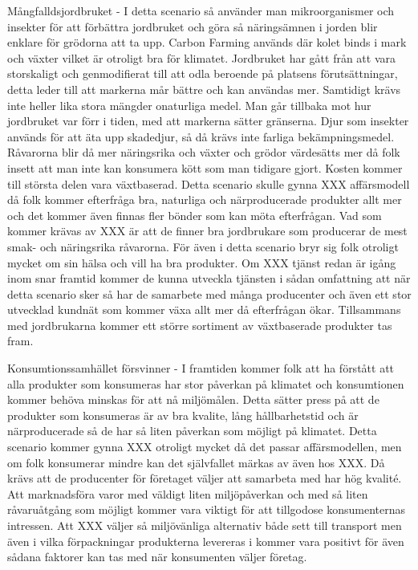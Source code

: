 \documentclass[10pt,a4paper,oneside]{article}
\begin{document}
Mångfalldsjordbruket - I detta scenario så använder man mikroorganismer och insekter för att förbättra jordbruket och göra så näringsämnen i jorden blir enklare för grödorna att ta upp. Carbon Farming används där kolet binds i mark och växter vilket är otroligt bra för klimatet. Jordbruket har gått från att vara storskaligt och genmodifierat till att odla beroende på platsens förutsättningar, detta leder till att markerna mår bättre och kan användas mer. Samtidigt krävs inte heller lika stora mängder onaturliga medel. Man går tillbaka mot hur jordbruket var förr i tiden, med att markerna sätter gränserna. Djur som insekter används för att äta upp skadedjur, så då krävs inte farliga bekämpningsmedel.  Råvarorna blir då mer näringsrika och växter och grödor värdesätts mer då folk insett att man inte kan konsumera kött som man tidigare gjort. Kosten kommer till största delen vara växtbaserad. Detta scenario skulle gynna XXX affärsmodell då folk kommer efterfråga bra, naturliga och närproducerade produkter allt mer och det kommer även finnas fler bönder som kan möta efterfrågan. Vad som kommer krävas av XXX är att de finner bra jordbrukare som producerar de mest smak- och näringsrika råvarorna. För även i detta scenario bryr sig folk otroligt mycket om sin hälsa och vill ha bra produkter. Om XXX tjänst redan är igång inom snar framtid kommer de kunna utveckla tjänsten i sådan omfattning att när detta scenario sker så har de samarbete med många producenter och även ett stor utvecklad kundnät som kommer växa allt mer då efterfrågan ökar. Tillsammans med jordbrukarna kommer ett större sortiment av växtbaserade produkter tas fram. 

Konsumtionssamhället försvinner - I framtiden kommer folk att ha förstått att alla produkter som konsumeras har stor påverkan på klimatet och konsumtionen kommer behöva minskas för att nå miljömålen. Detta sätter press på att de produkter som konsumeras är av bra kvalite, lång hållbarhetstid och är närproducerade så de har så liten påverkan som möjligt på klimatet. Detta scenario kommer gynna XXX otroligt mycket då det passar affärsmodellen, men om folk konsumerar mindre kan det självfallet märkas av även hos XXX. Då krävs att de producenter för företaget väljer att samarbeta med har hög kvalité. Att marknadsföra varor med väldigt liten miljöpåverkan och med så liten råvaruåtgång som möjligt kommer vara viktigt för att tillgodose konsumenternas intressen. Att XXX väljer så miljövänliga alternativ både sett till transport men även i vilka förpackningar produkterna levereras i kommer vara positivt för även sådana faktorer kan tas med när konsumenten väljer företag. 
\end{document}
